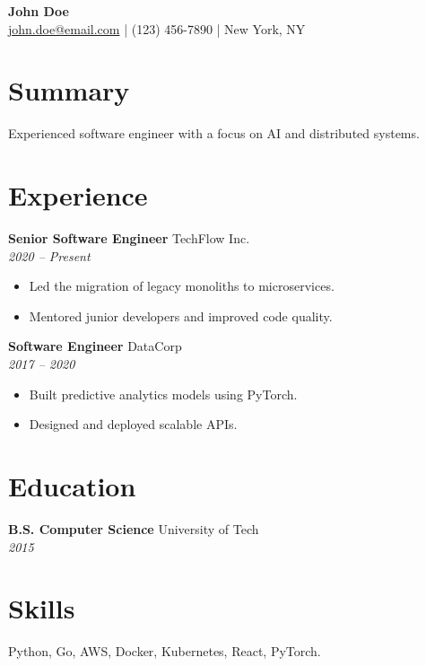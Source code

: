 \documentclass[11pt,a4paper]{article}
\begin{document}
\begin{center}
    {\Huge \textbf{John Doe}} \\
    \href{mailto:john.doe@email.com}{john.doe@email.com} | (123) 456-7890 | New York, NY
\end{center}

\section{Summary}
Experienced software engineer with a focus on AI and distributed systems.

\section{Experience}

\textbf{Senior Software Engineer} \hfill TechFlow Inc. \\
\textit{2020 -- Present}
\begin{itemize}[leftmargin=*]
    \item Led the migration of legacy monoliths to microservices.
    \item Mentored junior developers and improved code quality.
\end{itemize}

\textbf{Software Engineer} \hfill DataCorp \\
\textit{2017 -- 2020}
\begin{itemize}[leftmargin=*]
    \item Built predictive analytics models using PyTorch.
    \item Designed and deployed scalable APIs.
\end{itemize}

\section{Education}
\textbf{B.S. Computer Science} \hfill University of Tech \\
\textit{2015}

\section{Skills}
Python, Go, AWS, Docker, Kubernetes, React, PyTorch.
\end{document}
